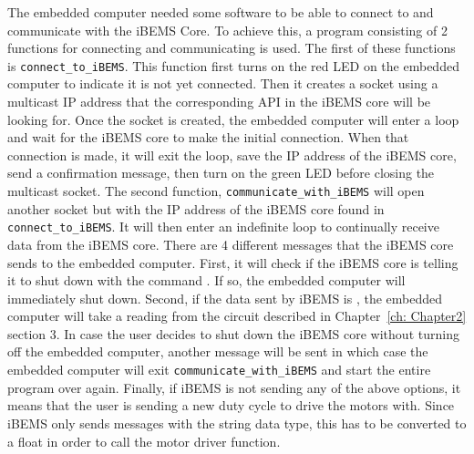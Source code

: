 The embedded computer needed some software to be able to connect to and communicate with the iBEMS Core. To achieve this, a program consisting of 2 functions for connecting and communicating is used.
\medbreak
The first of these functions is \texttt{connect\_to\_iBEMS}. This function first turns on the red LED on the embedded computer to indicate it is not yet connected. Then it creates a socket using a multicast IP address that the corresponding API in the iBEMS core will be looking for. Once the socket is created, the embedded computer will enter a loop and wait for the iBEMS core to make the initial connection. When that connection is made, it will exit the loop, save the IP address of the iBEMS core, send a confirmation message, then turn on the green LED before closing the multicast socket.
\medbreak
The second function, \texttt{communicate\_with\_iBEMS} will open another socket but with the IP address of the iBEMS core found in \texttt{connect\_to\_iBEMS}. It will then enter an indefinite loop to continually receive data from the iBEMS core. There are 4 different messages that the iBEMS core sends to the embedded computer. First, it will check if the iBEMS core is telling it to shut down with the command . If so, the embedded computer will immediately shut down. Second, if the data sent by iBEMS is , the embedded computer will take a reading from the circuit described in Chapter~\ref{ch: Chapter2} section 3. In case the user decides to shut down the iBEMS core without turning off the embedded computer, another message  will be sent in which case the embedded computer will exit \texttt{communicate\_with\_iBEMS} and start the entire program over again. Finally, if iBEMS is not sending any of the above options, it means that the user is sending a new duty cycle to drive the motors with. Since iBEMS only sends messages with the string data type, this has to be converted to a float in order to call the motor driver function. 


